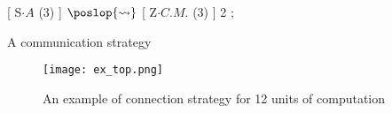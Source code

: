 \begin{algorithm}[H]
\dontprintsemicolon
\SetNoline
[ S$\cdot A$ (3) ] $\poslop{\rightsquigarrow}$ [ Z$\cdot C.M.$ (3) ] 2 ;
\caption{A communication strategy}\label{algo:comm_str_ex}
\end{algorithm}

\begin{figure}[h]
	\centering	
	\texttt{[image: ex\_top.png]}
	\caption{An example of connection strategy for 12 units of computation}\label{fig:ex_conn}
\end{figure}